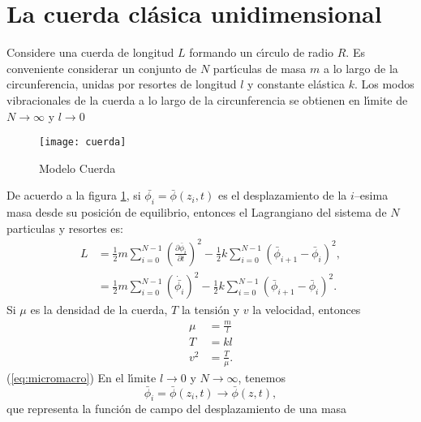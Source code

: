 
\section{La cuerda cl\'asica unidimensional}
\label{sec:la-cuerda-clasica}

Considere una cuerda de longitud $L$ formando un c\'\i rculo de radio $R$.
Es conveniente considerar un conjunto de $N$ part\'\i culas de masa $m$ a
lo largo de la circunferencia, unidas por resortes de longitud $l$ y
constante el\'astica $k$. Los modos vibracionales de la cuerda a lo
largo de la circunferencia se obtienen en l\'\i mite de $N\to\infty$ y $l\to0$ 

\begin{figure} %
  \centering %
  \texttt{[image: cuerda]} %
  \caption{Modelo Cuerda} %
  \label{fig:1string} %
\end{figure} %
De acuerdo a la figura 
\ref{fig:1string}, %
si $\bar{\phi_i}=\bar{\phi}(z_i,t)$ es el
desplazamiento de la $i$--esima masa desde su posici\'on de equilibrio,
entonces el Lagrangiano del sistema de $N$ particulas y resortes es:
\begin{align}
  \label{eq:1strLsum} %
  L&=\frac{1}{2}m\sum_{i=0}^{N-1}
  \left(
\frac{\partial\bar\phi_i}{\partial t}
  \right)^2-\frac{1}{2}k\sum_{i=0}^{N-1}
  \left(
\bar\phi_{i+1}-\bar\phi_{i}
  \right)^2,\\
  \label{eq:1strLsumdot} 
&=\frac{1}{2}m\sum_{i=0}^{N-1}
  \left(
    \dot{\bar{\phi_i}}
  \right)^2-\frac{1}{2}k\sum_{i=0}^{N-1}
  \left(
\bar\phi_{i+1}-\bar\phi_{i}
  \right)^2.
\end{align}
Si $\mu$ es la densidad de la cuerda, $T$ la tensi\'on y $v$ la velocidad, entonces
\begin{align}
  \label{eq:micromacro}
  \mu&=\frac{m}{l}\nonumber\\
  T&=kl\\
  v^2&=\frac{T}{\mu}.\nonumber
\end{align}
(\ref{eq:micromacro})
En el l\'\i mite $l\to0$ y $N\to\infty$, tenemos
\begin{equation}
  \label{eq:barf}
  \bar\phi_i=\bar\phi(z_i,t)\to\bar\phi(z,t),
\end{equation}
que representa la funci\'on de campo del desplazamiento de una masa
